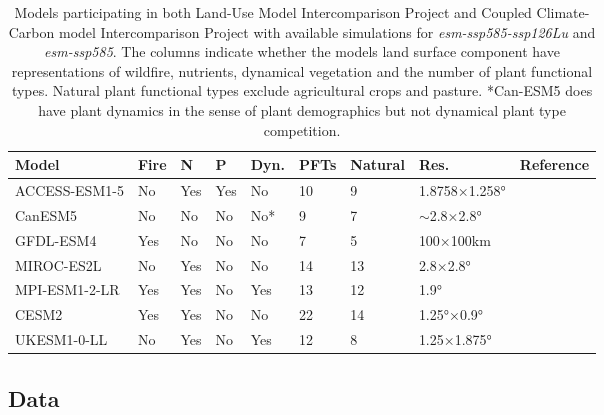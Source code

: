\documentclass[]{article}
\begin{document}
\begin{table}[H]
    \centering
    \begin{tabular}{lllllllll}
        \hline
Model         & Fire & N   & P   & Dyn.  & PFTs     & Natural & Res.           & Reference                           \\ \hline
ACCESS-ESM1-5 & No   & Yes & Yes & No    & 10       & 9       & 1.8758×1.258°   & \cite{ziehn_australian_2020}   \\
CanESM5       & No   & No  & No  & No*   & 9        & 7       & $\sim$2.8×2.8°  & \cite{swart_canadian_2019}     \\
GFDL-ESM4     & Yes  & No  & No  & No    & 7        & 5       & 100×100km       & \cite{dunne_gfdl_2020}         \\
MIROC-ES2L    & No   & Yes & No  & No    & 14       & 13      & 2.8×2.8°        & \cite{hajima_development_2020} \\
MPI-ESM1-2-LR & Yes  & Yes & No  & Yes   & 13       & 12      & 1.9°            & \cite{giorgetta_climate_2013}  \\
CESM2         & Yes  & Yes & No  & No    & 22       & 14      & 1.25°×0.9°      & \cite{danabasoglu_community_2020} \\
UKESM1-0-LL   & No   & Yes & No  & Yes   & 12       & 8       & 1.25×1.875°     & \cite{sellar_ukesm1_2019}      \\ \hline
    \end{tabular}
    \caption{Models participating in both Land-Use Model Intercomparison Project and Coupled Climate-Carbon model Intercomparison Project with available simulations for \textit{esm-ssp585-ssp126Lu} and \textit{esm-ssp585}. The columns indicate whether the models land surface component have representations of wildfire, nutrients, dynamical vegetation and the number of plant functional types. Natural plant functional types exclude agricultural crops and pasture. *Can-ESM5 does have plant dynamics in the sense of plant demographics but not dynamical plant type competition.}
    \label{tab:models}
\end{table}

\subsection{Data}
\end{document}
